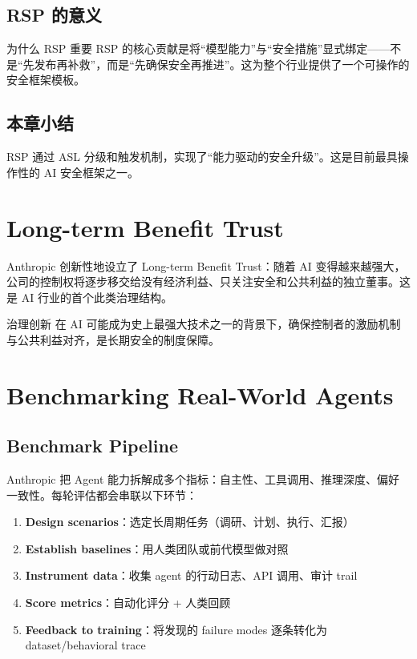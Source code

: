 \documentclass[a4paper]{article}
\begin{document}
\subsection{RSP 的意义}

\begin{knowledgebox}{为什么 RSP 重要}
RSP 的核心贡献是将``模型能力''与``安全措施''显式绑定——不是``先发布再补救''，而是``先确保安全再推进''。这为整个行业提供了一个可操作的安全框架模板。
\end{knowledgebox}

\subsection{本章小结}

RSP 通过 ASL 分级和触发机制，实现了``能力驱动的安全升级''。这是目前最具操作性的 AI 安全框架之一。

\section{Long-term Benefit Trust}

Anthropic 创新性地设立了 Long-term Benefit Trust：随着 AI 变得越来越强大，公司的控制权将逐步移交给没有经济利益、只关注安全和公共利益的独立董事。这是 AI 行业的首个此类治理结构。

\begin{importantbox}{治理创新}
在 AI 可能成为史上最强大技术之一的背景下，确保控制者的激励机制与公共利益对齐，是长期安全的制度保障。
\end{importantbox}

\section{Benchmarking Real-World Agents}

\subsection{Benchmark Pipeline}

Anthropic 把 Agent 能力拆解成多个指标：自主性、工具调用、推理深度、偏好一致性。每轮评估都会串联以下环节：

\begin{enumerate}
    \item \textbf{Design scenarios}：选定长周期任务（调研、计划、执行、汇报）
    \item \textbf{Establish baselines}：用人类团队或前代模型做对照
    \item \textbf{Instrument data}：收集 agent 的行动日志、API 调用、审计 trail
    \item \textbf{Score metrics}：自动化评分 + 人类回顾
    \item \textbf{Feedback to training}：将发现的 failure modes 逐条转化为 dataset/behavioral trace
\end{enumerate}
\end{document}
